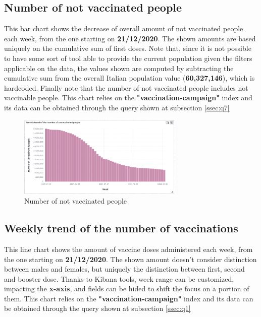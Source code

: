 \documentclass{article}[IEEEtran]
\begin{document}
\subsection{Number of not vaccinated people}\label{ssec:dash2}

This bar chart shows the decrease of overall amount of not vaccinated people each week, from the one starting on \textbf{21/12/2020}.
The shown amounts are based uniquely on the cumulative sum of first doses. Note that, since it is not possible to have some sort of tool able to provide the current population given the filters applicable on the data,
the values shown are computed by subtracting the cumulative sum from the overall Italian population value (\textbf{60,327,146}), which is hardcoded. 
Finally note that the number of not vaccinated people includes not vaccinable people.
This chart relies on the \textbf{"vaccination-campaign"} index and its data can be obtained through the query shown at subsection \ref{ssec:q7}

\begin{figure}[H]
\begin{center}
    \includegraphics[width=0.7\textwidth, frame]{Number of not vaccinated people.png}
    \caption{Number of not vaccinated people}
\end{center}
\end{figure}


\subsection{Weekly trend of the number of vaccinations}\label{ssec:dash3}

This line chart shows the amount of vaccine doses administered each week, from the one starting on \textbf{21/12/2020}. The shown amount doesn't consider distinction between males and females, but uniquely the distinction between first, second and booster dose. Thanks to Kibana tools, week range can be customized, impacting the \textbf{x-axis}, and fields can be hided to shift the focus on a portion of them. This chart relies on the \textbf{"vaccination-campaign"} index and its data can be obtained through the query shown at subsection \ref{ssec:q1}
\end{document}

